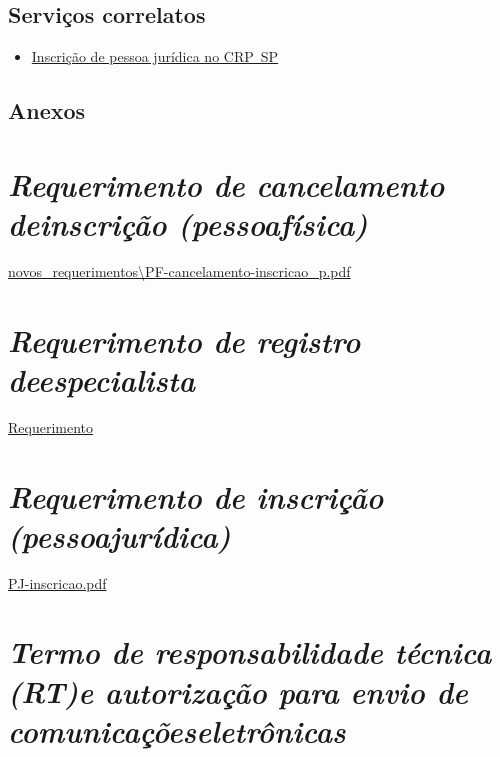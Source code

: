\section{Serviços correlatos}

\begin{itemize}
  \item  \hyperref[]{Inscrição  de pessoa jurídica no CRP~SP}
\end{itemize}

\section{Anexos}

\chapter{\texorpdfstring{\emph{Requerimento de cancelamento deinscrição (pessoafísica)}}{Requerimento de cancelamento de inscrição (pessoa física)}}

\href{file:///C:/Users/angelo.cuissi/Documents/cuissi/caderno/revisão/202406/carta-de-servicos/carta-preparacao-de-original/novos_requerimentos/PF-cancelamento-inscricao_p.pdf}{novos\_requerimentos\textbackslash PF-cancelamento-inscricao\_p.pdf}

\chapter{\texorpdfstring{\emph{Requerimento de registro deespecialista}}{Requerimento de registro de especialista}}

\href{file:///C:/Users/angelo.cuissi/Documents/cuissi/caderno/revisão/202406/carta-de-servicos/carta-preparacao-de-original/PF-requerimento-especialista.pdf}{Requerimento}

\chapter{\texorpdfstring{\emph{Requerimento de inscrição (pessoajurídica)}}{Requerimento de inscrição (pessoa jurídica)}}

\href{file:///C:/Users/angelo.cuissi/Documents/cuissi/caderno/revisão/202406/carta-de-servicos/carta-preparacao-de-original/PJ-inscricao.pdf}{PJ-inscricao.pdf}

\chapter{\texorpdfstring{\emph{Termo de responsabilidade técnica (RT)e autorização para envio de comunicaçõeseletrônicas}}{Termo de responsabilidade técnica (RT) e autorização para envio de comunicações eletrônicas}}

